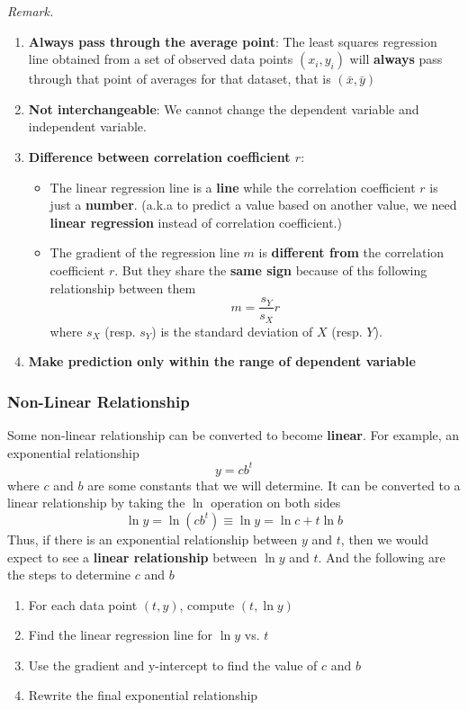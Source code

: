 \documentclass[math,code]{amznotes}
\theoremstyle{remark}
\begin{document}
\begin{notebox}
    \textit{Remark.}
    \begin{enumerate}
        \item \textbf{Always pass through the average point}: The least squares regression line obtained from a set of observed data points $(x_i, y_i)$ will \textbf{always} pass through that point of averages for that dataset, that is $(\bar{x}, \bar{y})$
        \item \textbf{Not interchangeable}: We cannot change the dependent variable and independent variable.
        \item \textbf{Difference between correlation coefficient $r$}:
        \begin{itemize}
            \item The linear regression line is a \textbf{line} while the correlation coefficient $r$ is just a \textbf{number}. (a.k.a to predict a value based on another value, we need \textbf{linear regression} instead of correlation coefficient.)
            \item The gradient of the regression line $m$ is \textbf{different from} the correlation coefficient $r$. But they share the \textbf{same sign} because of ths following relationship between them
            \begin{equation*}
                m=\frac{s_Y}{s_X}r
            \end{equation*}
            where $s_X$ (resp. $s_Y$) is the standard deviation of $X$ (resp. $Y$).
        \end{itemize}
        \item \textbf{Make prediction only within the range of dependent variable}
    \end{enumerate}
\end{notebox}
\subsubsection{Non-Linear Relationship}
Some non-linear relationship can be converted to become \textbf{linear}. For example, an exponential relationship
\begin{equation*}
    y=cb^t
\end{equation*}where $c$ and $b$ are some constants that we will determine. It can be converted to a linear relationship by taking the $\ln$ operation on both sides
\begin{equation*}
    \ln y=\ln(cb^t)\equiv\ln y=\ln c +t\ln b
\end{equation*}
Thus, if there is an exponential relationship between $y$ and $t$, then we would expect to see a \textbf{linear relationship} between $\ln y$ and $t$. And the following are the steps to determine $c$ and $b$
\begin{enumerate}
    \item For each data point $(t,y)$, compute $(t, \ln y)$
    \item Find the linear regression line for $\ln y$ vs. $t$
    \item Use the gradient and y-intercept to find the value of $c$ and $b$
    \item Rewrite the final exponential relationship
\end{enumerate}
\end{document}
